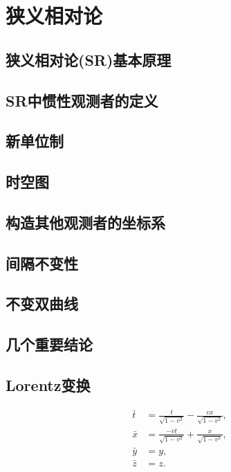 \chapter{狭义相对论}
\label{chap1}

\section{狭义相对论(SR)基本原理}
\label{sec1.1}

\section{SR中惯性观测者的定义}
\label{sec1.2}

\section{新单位制}
\label{sec1.3}

\section{时空图}
\label{sec1.4}

\section{构造其他观测者的坐标系}
\label{sec1.5}

\section{间隔不变性}
\label{sec1.6}

\section{不变双曲线}
\label{sec1.7}

\section{几个重要结论}
\label{sec1.8}

\section{Lorentz变换}
\label{sec1.9}
\begin{shaded}
\begin{equation}
\begin{split}
    \bar{t} &= \frac{t}{\sqrt{1 - v^2}} - \frac{vx}{\sqrt{1 - v^2}}, \\
    \bar{x} &= \frac{-vt}{\sqrt{1 - v^2}} + \frac{x}{\sqrt{1 - v^2}}, \\
    \bar{y} &= y, \\
    \bar{z} &= z.
\end{split}
\label{equ1.12}
\end{equation}
\end{shaded}

